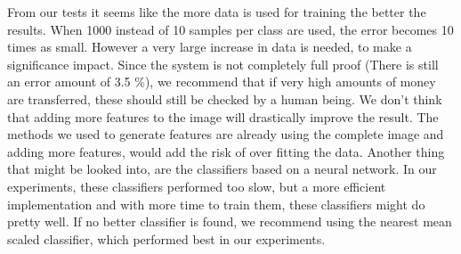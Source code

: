 \documentclass[%
        compressed,
        final,
        notitlepage,
        narroweqnarray,
        inline,
        twoside,
        ]{ieee}
\begin{document}
From our tests it seems like the more data is used for training the better the
results. When 1000 instead of 10 samples per class are used, the error becomes
10 times as small. However a very large increase in data is needed, to make a
significance impact.  Since the system is not completely full proof (There is
still an error amount of 3.5 \%), we recommend that if very high amounts of
money are transferred, these should still be checked by a human being.
We don't think that adding more features to the image will drastically improve
the result. The methods we used to generate features are already using the
complete image and adding more features, would add the risk of over fitting the
data.
Another thing that might be looked into, are the classifiers based on a neural
network. In our experiments, these classifiers performed too slow, but a more
efficient implementation and with more time to train them, these classifiers
might do pretty well.
If no better classifier is found, we recommend using the nearest mean scaled
classifier, which performed best in our experiments.




\end{document}
